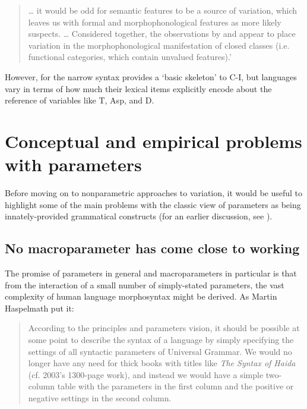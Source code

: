 \documentclass[output=paper,
modfonts
]{LSP/langsci}
\begin{document}
\begin{quote}
\ldots{} it would be odd for semantic features to be a source of
variation, which leaves us with formal and morphophonological features
as more likely suspects. \ldots{} Considered together, the observations
by \citet{chomsky2001b} and \citet{kayne2005,kayne2008} appear to place variation in
the morphophonological manifestation of closed classes (i.e. functional
categories, which contain unvalued features).' \citep[543--544]{gallego2011}
\end{quote}

However, for \citet{ramchand2008} the narrow syntax provides a
`basic skeleton' to C-I, but languages vary in terms of how much their
lexical items explicitly encode about the reference of variables like T,
Asp, and D.

\section{Conceptual and empirical problems with parameters}

Before moving on to nonparametric approaches to variation, it would be
useful to highlight some of the main problems with the classic view of
parameters as being innately-provided grammatical constructs (for an
earlier discussion, see \citealt{newmeyer2005}).

\subsection{No macroparameter has come close to working}

The promise of parameters in general and macroparameters in particular
is that from the interaction of a small number of simply-stated
parameters, the vast complexity of human language morphosyntax might be
derived. As Martin Haspelmath put it:

\begin{quote}
According to the principles and parameters vision, it should be possible
at some point to describe the syntax of a language by simply specifying
the settings of all syntactic parameters of Universal Grammar. We would
no longer have any need for thick books with titles like \emph{The
Syntax of Haida} (cf. \citeauthor{enrico2003} 2003's 1300-page work), and instead we
would have a simple two-column table with the parameters in the first
column and the positive or negative settings in the second column.
\citep[80]{haspelmath2008}
\end{quote}
\end{document}
